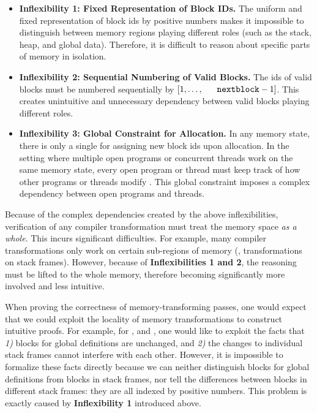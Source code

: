 \begin{itemize}
\item 
\textbf{Inflexibility 1: Fixed Representation of Block IDs.}
%
The uniform and fixed representation of block ids by positive numbers
makes it impossible to distinguish between memory regions
playing different roles (such as the stack, heap, and global
data). Therefore, it is difficult to reason about specific parts of
memory in isolation.

\item
\textbf{Inflexibility 2: Sequential Numbering of Valid Blocks.}  
%
The ids of valid
blocks must be numbered sequentially by $[1,\ldots,\nextblock-1]$.
This creates unintuitive and unnecessary dependency between valid
blocks playing different roles.

\item
\textbf{Inflexibility 3: Global Constraint for Allocation.}
%
In any memory state, there is only a single \nextblock for assigning
new block ids upon allocation. In the setting where multiple open
programs or concurrent threads work on the same memory state, every
open program or thread must keep track of how other programs or
threads modify \nextblock. This global constraint imposes a complex
dependency between open programs and threads.
\end{itemize}

Because of the complex dependencies created by the above
inflexibilities, verification of any compiler transformation must
treat the memory space \emph{as a whole}. This incurs significant
difficulties.
For example, many
compiler transformations only work on certain sub-regions of memory
(\eg, transformations on stack frames). However, because of
\textbf{Inflexibilities 1 and 2}, the reasoning must be lifted to the
whole memory, therefore becoming significantly more involved and less
intuitive.

When proving the correctness of memory-transforming passes, one
would expect that we could exploit the locality of memory
transformations to construct intuitive proofs. For example, for
,  and , one would
like to exploit the facts that \emph{1)} blocks for global definitions
are unchanged, and \emph{2)} the changes to individual stack frames
cannot interfere with each other. However, it is impossible to
formalize these facts directly because we can neither distinguish
blocks for global definitions from blocks in stack frames, nor tell
the differences between blocks in different stack frames: they are all
indexed by positive numbers. This problem is exactly caused by
\textbf{Inflexibility 1} introduced above.

